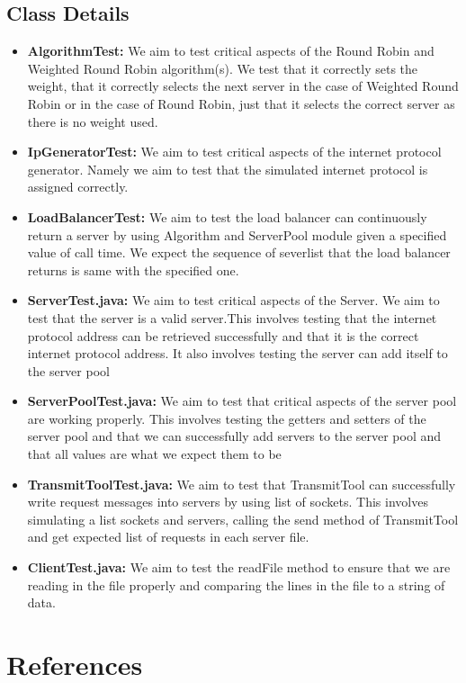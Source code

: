 \documentclass[12pt]{article}
\begin{document}
\subsection{Class Details}
\begin{itemize}
    \item \textbf{AlgorithmTest: }We aim to test critical aspects of the Round Robin and Weighted Round Robin algorithm(s). We test that it correctly sets the weight, that it correctly selects the next server in the case of Weighted Round Robin or in the case of Round Robin, just that it selects the correct server as there is no weight used. 
    \item \textbf{IpGeneratorTest: }We aim to test critical aspects of the internet protocol generator. Namely we aim to test that the simulated internet protocol is assigned correctly. 
    \item \textbf{LoadBalancerTest: }We aim to test the load balancer can continuously return a server by using Algorithm and ServerPool module given a specified value of call time. We expect the sequence of severlist that the load balancer returns is same with the specified one.
    \item \textbf{ServerTest.java: }We aim to test critical aspects of the Server. We aim to test that the server is a valid server.This involves testing that the internet protocol address can be retrieved successfully and that it is the correct internet protocol address. It also involves testing the server can add itself to the server pool 
    \item \textbf{ServerPoolTest.java: }We aim to test that critical aspects of the server pool are working properly. This involves testing the getters and setters of the server pool and that we can successfully add servers to the server pool and that all values are what we expect them to be 
    \item \textbf{TransmitToolTest.java: }We aim to test that TransmitTool can successfully write request messages into servers by using list of sockets. This involves simulating a list sockets and servers, calling the send method of TransmitTool and get expected list of requests in each server file.
    \item \textbf{ClientTest.java: } We aim to test the readFile method to ensure that we are reading in the file properly and comparing the lines in the file to a string of data.
    
\end{itemize}
\section{References}
\printbibliography[heading=none]
\end{document}
